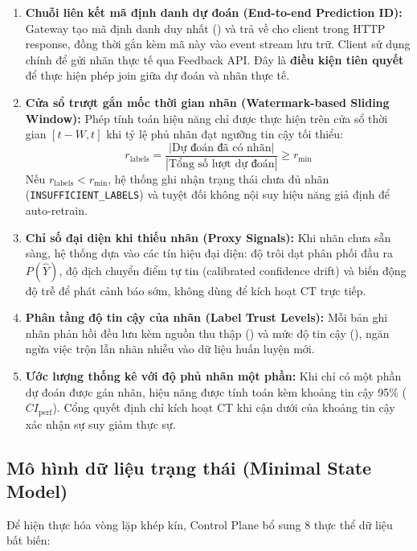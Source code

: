 \begin{enumerate}
  \item \textbf{Chuỗi liên kết mã định danh dự đoán (End-to-end Prediction ID):} Gateway  tạo mã định danh duy nhất () và trả về cho client trong HTTP response, đồng thời gắn kèm mã này vào event stream lưu trữ. Client sử dụng chính  để gửi nhãn thực tế qua Feedback API. Đây là \textbf{điều kiện tiên quyết} để thực hiện phép join giữa dự đoán và nhãn thực tế.
  \item \textbf{Cửa sổ trượt gắn mốc thời gian nhãn (Watermark-based Sliding Window):} Phép tính toán hiệu năng chỉ được thực hiện trên cửa sổ thời gian $[t-W, t]$ khi tỷ lệ phủ nhãn đạt ngưỡng tin cậy tối thiểu:
  $$r_\text{labels} = \frac{|\text{Dự đoán đã có nhãn}|}{|\text{Tổng số lượt dự đoán}|} \ge r_\text{min}$$
  Nếu $r_\text{labels} < r_\text{min}$, hệ thống ghi nhận trạng thái chưa đủ nhãn (\texttt{INSUFFICIENT\_LABELS}) và tuyệt đối không nội suy hiệu năng giả định để auto-retrain.
  \item \textbf{Chỉ số đại diện khi thiếu nhãn (Proxy Signals):} Khi nhãn chưa sẵn sàng, hệ thống dựa vào các tín hiệu đại diện: độ trôi dạt phân phối đầu ra $P(\hat{Y})$, độ dịch chuyển điểm tự tin (calibrated confidence drift) và biến động độ trễ để phát cảnh báo sớm, không dùng để kích hoạt CT trực tiếp.
  \item \textbf{Phân tầng độ tin cậy của nhãn (Label Trust Levels):} Mỗi bản ghi nhãn phản hồi đều lưu kèm nguồn thu thập () và mức độ tin cậy (), ngăn ngừa việc trộn lẫn nhãn nhiễu vào dữ liệu huấn luyện mới.
  \item \textbf{Ước lượng thống kê với độ phủ nhãn một phần:} Khi chỉ có một phần dự đoán được gán nhãn, hiệu năng được tính toán kèm khoảng tin cậy 95\% ($CI_\text{perf}$). Cổng quyết định chỉ kích hoạt CT khi cận dưới của khoảng tin cậy xác nhận sự suy giảm thực sự.
\end{enumerate}

\subsection{Mô hình dữ liệu trạng thái (Minimal State Model)}

Để hiện thực hóa vòng lặp khép kín, Control Plane bổ sung 8 thực thể dữ liệu bất biến:


